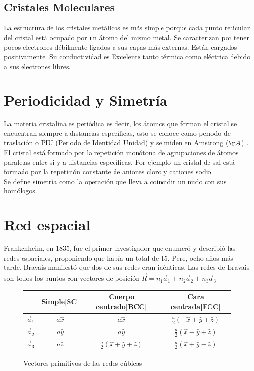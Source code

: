 \documentclass[oneside]{book}
\numberwithin{equation}{section}
\numberwithin{figure}{section}
\numberwithin{table}{section}
\begin{document}
			\subsection{Cristales Moleculares}
			
				La estructura de los cristales metálicos es más simple porque cada punto reticular del cristal está ocupado por un átomo del mismo metal.
Se caracterizan por tener pocos electrones débilmente ligados a sus capas más externas. Están cargados positivamente. Su conductividad es Excelente tanto térmica como eléctrica debido a sus electrones libres.
			
		\section{Periodicidad y Simetría}
		
			La materia cristalina es periódica es decir, los átomos que forman el cristal se encuentran siempre a distancias específicas, esto se conoce como periodo de traslación o PIU (Periodo de Identidad Unidad) y se miden en Amstrong ($\AA$) . El cristal está formado por la repetición monótona de agrupaciones de átomos paralelas entre si y a distancias específicas. Por ejemplo un cristal de sal está formado por la repetición constante de aniones cloro y cationes sodio.\\
			
			Se define simetría como la operación que lleva a coincidir un nudo con sus homólogos.
				
		\section{Red espacial}
		
			Frankenheim, en 1835, fue el primer investigador que enumeró y describió las redes espaciales, proponiendo que había un total de 15. Pero, ocho años más tarde, Bravais manifestó que dos de sus redes eran idénticas.	Las redes de Bravais son todos los puntos con vectores de posición $\vec{R}=n_1\vec{a}_1+n_2\vec{a}_2+n_3\vec{a}_3$\\
		
		\begin{figure}[H]
			\begin{center}
				\begin{tabular}{c|c|c|c}
					 & Simple[SC] & Cuerpo centrado[BCC]& Cara centrada[FCC] \\ 
					\hline $\vec{a}_1$ & $a\hat{x}$ & $a\hat{x}$ & $\frac{a}{2}(-\hat{x}+\hat{y}+\hat{z})$ \\ 
					\hline $\vec{a}_2$ & $a\hat{y}$ & $a\hat{y}$ & $\frac{a}{2}(\hat{x}-\hat{y}+\hat{z})$ \\ 
					\hline $\vec{a}_3$ & $a\hat{z}$ & $\frac{a}{2}(\hat{x}+\hat{y}+\hat{z})$ & $\frac{a}{2}(\hat{x}+\hat{y}-\hat{z})$\\ 
				\end{tabular} 
			\end{center}
			\caption{Vectores primitivos de las redes cúbicas}
		\end{figure}					
		
\end{document}
